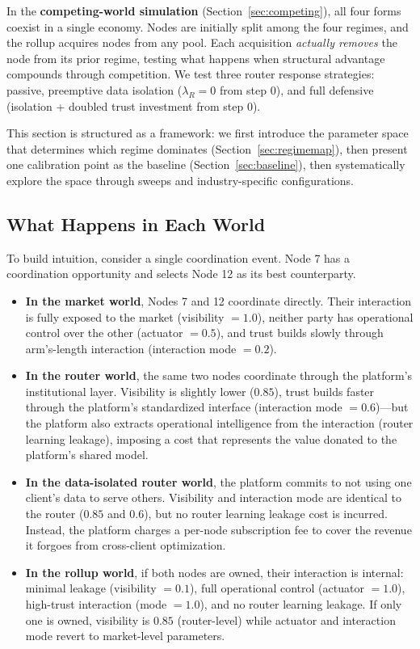 \documentclass[12pt]{article}
\theoremstyle{definition}
\begin{document}
In the \textbf{competing-world simulation} (Section~\ref{sec:competing}), all four forms coexist in a single economy. Nodes are initially split among the four regimes, and the rollup acquires nodes from any pool. Each acquisition \textit{actually removes} the node from its prior regime, testing what happens when structural advantage compounds through competition. We test three router response strategies: passive, preemptive data isolation ($\lambda_R = 0$ from step 0), and full defensive (isolation + doubled trust investment from step 0).

This section is structured as a framework: we first introduce the parameter space that determines which regime dominates (Section~\ref{sec:regimemap}), then present one calibration point as the baseline (Section~\ref{sec:baseline}), then systematically explore the space through sweeps and industry-specific configurations.

\subsection{What Happens in Each World}

To build intuition, consider a single coordination event. Node 7 has a coordination opportunity and selects Node 12 as its best counterparty.

\begin{itemize}[leftmargin=*]
\item \textbf{In the market world}, Nodes 7 and 12 coordinate directly. Their interaction is fully exposed to the market (visibility $= 1.0$), neither party has operational control over the other (actuator $= 0.5$), and trust builds slowly through arm's-length interaction (interaction mode $= 0.2$).

\item \textbf{In the router world}, the same two nodes coordinate through the platform's institutional layer. Visibility is slightly lower ($0.85$), trust builds faster through the platform's standardized interface (interaction mode $= 0.6$)---but the platform also extracts operational intelligence from the interaction (router learning leakage), imposing a cost that represents the value donated to the platform's shared model.

\item \textbf{In the data-isolated router world}, the platform commits to not using one client's data to serve others. Visibility and interaction mode are identical to the router ($0.85$ and $0.6$), but no router learning leakage cost is incurred. Instead, the platform charges a per-node subscription fee to cover the revenue it forgoes from cross-client optimization.

\item \textbf{In the rollup world}, if both nodes are owned, their interaction is internal: minimal leakage (visibility $= 0.1$), full operational control (actuator $= 1.0$), high-trust interaction (mode $= 1.0$), and no router learning leakage. If only one is owned, visibility is $0.85$ (router-level) while actuator and interaction mode revert to market-level parameters.
\end{itemize}
\end{document}
